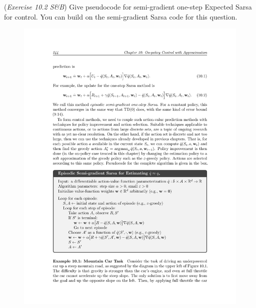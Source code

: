 (\textit{Exercise 10.2 S\&B})
Give pseudocode for semi-gradient one-step Expected Sarsa for control. You can build on the semi-gradient Sarsa code for this question.
%
\begin{figure}[h!]
  \center
  \includegraphics[width=0.75\linewidth]{figures/semisarsa.pdf}
\end{figure}
%